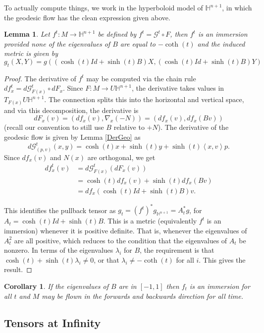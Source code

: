 \documentclass{amsart}
\newtheorem{lem}[thm]{Lemma}
\newtheorem{cor}[thm]{Corollary}
\renewcommand{\H}{\mathbb{H}}
\begin{document}
To actually compute things, we work in the hyperboloid model of $\H^{n+1}$,  in which the geodesic flow has the clean expression given above.

\begin{lem}
Let $f^t: M \to \H^{n+1}$ be defined by $f^t = \mathcal{G}^t \circ F$, then $f^t$ is an immersion provided none of the eigenvalues of $B$ are equal to $-\coth(t)$ and the induced metric is given by 
\[
g_t(X,Y) = g( (\cosh(t)Id + \sinh(t)B)X, (\cosh(t)Id + \sinh(t)B)Y)
\]
\end{lem}

\begin{proof}
The derivative of $f^t$ may be computed via the chain rule $df^t_x = d\mathcal{G}^t_{F(x)} \circ dF_x$.
Since $F: M \to U\H^{n+1}$, the derivative takes values in $T_{F(x)}U\H^{n+1}$.
The connection splits this into the horizontal and vertical space, and via this decomposition, the derivative is 
\[
dF_x(v) = (df_x(v),\nabla_x(-N)) = (df_x(v),df_x(Bv))
\]
(recall our convention to still use $B$ relative to $+N$).
The derivative of the geodesic flow is given by Lemma \ref{DerGeo} as
\[
d\mathcal{G}^t_{(p,v)}(x,y) = \cosh(t)x + \sinh(t)y + \sinh(t)\left< x,v \right> p.
\]
Since $df_x(v)$ and $N(x)$ are orthogonal, we get
\begin{align*}
df^t_x(v) &= d\mathcal{G}^t_{F(x)}(dF_x(v)) \\
&= \cosh(t)df_x(v) + \sinh(t)df_x(Bv) \\
&= df_x(\cosh(t)Id + \sinh(t)B)v.
\end{align*}


This identifies the pullback tensor as $g_t = (f^t)^*g_{\H^{n+1}} = A_t^*g$, for $A_t = \cosh(t)Id + \sinh(t)B$.
This is a metric (equivalently $f^t$ is an immersion) whenever it is positive definite.
That is, whenever the eigenvalues of $A_t^2$ are all positive, which reduces to the condition that the eigenvalues of $A_t$ be nonzero. 
In terms of the eigenvalues $\lambda_i$ for $B$, the requirement is that $\cosh(t) + \sinh(t)\lambda_i \neq 0$, or that $\lambda_i \neq -\coth(t)$ for all $i$. 
This gives the result.
\end{proof}

\begin{cor}
If the eigenvalues of $B$ are in $[-1,1]$ then $f_t$ is an immersion for all $t$ and $M$ may be flown in the forwards and backwards direction for all time. 
\end{cor}


\subsection{Tensors at Infinity}
\end{document}
